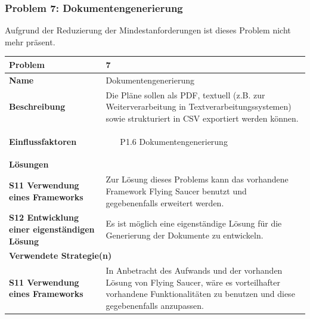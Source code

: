 \documentclass[fontsize=12pt,paper=a4,twoside]{scrartcl}
\begin{document}
\subsubsection{Problem 7: Dokumentengenerierung}

Aufgrund der Reduzierung der Mindestanforderungen ist dieses Problem nicht mehr präsent.\\

\begin{tabularx}{\textwidth}{|p{6cm}|X|}
 \hline
 \textbf{Problem} & 7\\\hline
 \textbf{Name} & Dokumentengenerierung\\\hline 
 \textbf{Beschreibung} & 
Die Pläne sollen als PDF, textuell (z.B. zur Weiterverarbeitung in Textverarbeitungssystemen) sowie strukturiert in CSV exportiert werden können. \\\hline
 \textbf{Einflussfaktoren} &
 \begin{itemize}
\item[P1.6] Dokumentengenerierung
 \end{itemize}\\\hline
\multicolumn{2}{|l|}{\textbf{Lösungen}} \\\hline
\textbf{S11 Verwendung eines Frameworks} & Zur Lösung dieses Problems kann das vorhandene Framework Flying Saucer benutzt und gegebenenfalls erweitert werden. \\\hline
\textbf{S12 Entwicklung einer eigenständigen Lösung} & Es ist möglich eine eigenständige Lösung für die Generierung der Dokumente zu entwickeln. \\\hline
\multicolumn{2}{|l|}{\textbf{Verwendete Strategie(n)}} \\\hline
 \textbf{S11 Verwendung eines Frameworks}   & In Anbetracht des Aufwands und der vorhanden Lösung von Flying Saucer, wäre es vorteilhafter vorhandene Funktionalitäten zu benutzen und diese gegebenenfalls anzupassen. \\\hline
\end{tabularx}

\newpage
\end{document}
